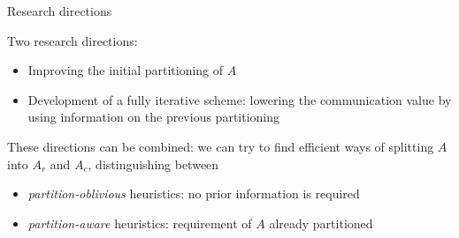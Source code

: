 \begin{frame}{Research directions}


	Two research directions:

\begin{itemize}
	\item Improving the initial partitioning of $A$
	\item Development of a fully iterative scheme: lowering the communication value by using information on the previous partitioning 
\end{itemize}

These directions can be combined: we can try to find efficient ways of splitting $A$ into $A_r$ and $A_c$, distinguishing between

\begin{itemize}
	\item \emph{partition-oblivious} heuristics: no prior information is required
	\item \emph{partition-aware} heuristics: requirement of $A$ already partitioned
\end{itemize}
\end{frame}


